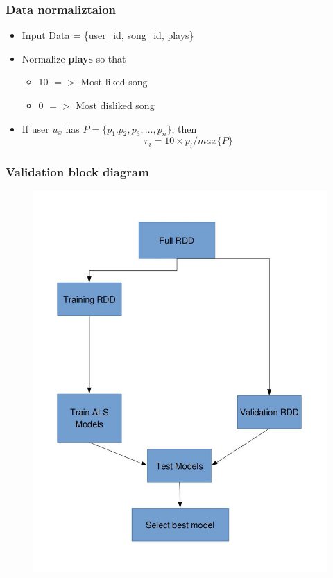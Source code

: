 \documentclass[11pt]{beamer}
\begin{document}
\begin{frame}
  \frametitle{Data normaliztaion}
  \begin{itemize}
    \item Input Data = \{user\_id, song\_id, plays\}
    \item Normalize {\bf plays} so that
      \begin{itemize}
        \item 10 $=>$ Most liked song
        \item 0 $=>$ Most disliked song
      \end{itemize}
    \item If user $u_x$ has $P = \{p_1. p_2, p_3,\dots,p_n	\}$, then
      \begin{equation}
        r_i = 10 \times p_i/max\{P\}
      \end{equation}
  \end{itemize}
\end{frame}


\begin{frame}
  \frametitle{Validation block diagram}
  \begin{figure}
    \includegraphics[width=0.5\linewidth]{figures/Validation.jpg}
  \end{figure}
\end{frame}
\end{document}
